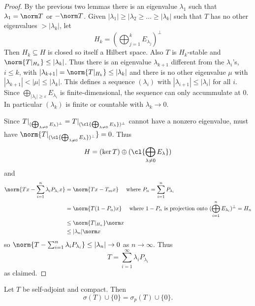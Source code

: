 \documentclass[a4paper]{article}
\begin{document}
\begin{proof}
  By the previous two lemmas there is an eigenvalue \(\lambda_1\) such that \(\lambda_1 = \norm T\) or \(- \norm T\). Given \(|\lambda_1| \geq |\lambda_2 \geq \dots \geq |\lambda_k|\) such that \(T\) has no other eigenvalues \(> |\lambda_k|\), let
  \[
    H_k = (\bigoplus_{j = 1}^k E_{\lambda_j})^\perp
  \]
  Then \(H_k \subseteq H\) is closed so itself a Hilbert space. Also \(T\) is \(H_k\)-stable and \(\norm{T|_{H_k}} \leq |\lambda_k|\). Thus there is an eigenvalue \(\lambda_{k + 1}\) different from the \(\lambda_i\)'s, \(i \leq k\), with \(|\lambda_{k + 1}| = \norm{T|_{H_k}} \leq |\lambda_k|\) and there is no other eigenvalue \(\mu\) with \(|\lambda_{k + 1}| < |\mu| \leq |\lambda_k|\). This defines a sequence \((\lambda_i)\) with \(|\lambda_{i + 1}| \leq |\lambda_i|\) for all \(i\). Since \(\bigoplus_{|\lambda_i| \geq \varepsilon} E_{\lambda_i}\) is finite-dimensional, the sequence can only accummulate at \(0\). In particular \((\lambda_k)\) is finite or countable with \(\lambda_k \to 0\).

  Since \(T|_{(\bigoplus_{\lambda \neq 0} E_\lambda)^\perp} = T|_{(\cl{\bigoplus_{\lambda \neq 0} E_\lambda})^\perp}\) cannot have a nonzero eigenvalue, must have \(\norm{T|_{(\cl{\bigoplus_{\lambda \neq 0} E_\lambda})^\perp}} = 0\). Thus
  \[
    H = (\ker T) \oplus (\cl{\bigoplus_{\lambda \neq 0} E_\lambda})
  \]
  and
  \begin{align*}
    \norm{Tx - \sum_{i = 1}^n \lambda_i P_{\lambda_i} x}
    &= \norm{Tx - T_m x} \quad \text{ where } P_n = \sum_{i = 1}^n P_{\lambda_i} \\
    &= \norm{T(1 - P_n) x} \quad \text{ where } 1 - P_n \text{ is projection onto } (\bigoplus_{i = 1}^n E_{\lambda_i})^\perp = H_n \\
    &\leq \norm{T|_{H_n}} \norm x \\
    &\leq |\lambda_n| \norm x
  \end{align*}
  so \(\norm{T - \sum_{i = 1}^n \lambda_i P_{\lambda_i}} \leq |\lambda_n| \to 0\) as \(n \to \infty\). Thus
  \[
    T = \sum_{i = 1}^\infty \lambda_i P_{\lambda_i}
  \]
  as claimed.
\end{proof}

\begin{corollary}
  Let \(T\) be self-adjoint and compact. Then
  \[
    \sigma(T) \cup \{0\} = \sigma_p(T) \cup \{0\}.
  \]
\end{corollary}
\end{document}
